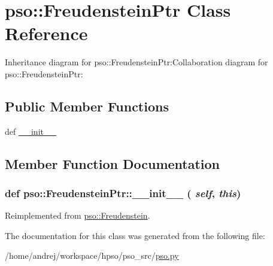 \hypertarget{classpso_1_1FreudensteinPtr}{
\section{pso::FreudensteinPtr Class Reference}
\label{classpso_1_1FreudensteinPtr}
}
Inheritance diagram for pso::FreudensteinPtr:Collaboration diagram for pso::FreudensteinPtr:\subsection*{Public Member Functions}
\begin{CompactItemize}
\item 
def \hyperlink{classpso_1_1FreudensteinPtr_605822702b355b32a6ca939c0aae1656}{\_\-\_\-init\_\-\_\-}
\end{CompactItemize}


\subsection{Member Function Documentation}
\hypertarget{classpso_1_1FreudensteinPtr_605822702b355b32a6ca939c0aae1656}{
\subsubsection{\setlength{\rightskip}{0pt plus 5cm}def pso::FreudensteinPtr::\_\-\_\-init\_\-\_\- ( {\em self}, \/   {\em this})}}
\label{classpso_1_1FreudensteinPtr_605822702b355b32a6ca939c0aae1656}




Reimplemented from \hyperlink{classpso_1_1Freudenstein_5bede09ddc059943e97451908bf5b622}{pso::Freudenstein}.

The documentation for this class was generated from the following file:\begin{CompactItemize}
\item 
/home/andrej/workspace/hpso/pso\_\-src/\hyperlink{pso_8py}{pso.py}\end{CompactItemize}
